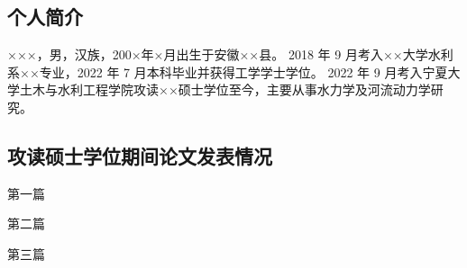 
\begin{resume}

\subsection*{个人简介}

×××，男，汉族，200×年×月出生于安徽××县。
2018 年 9 月考入××大学水利系××专业，2022 年 7 月本科毕业并获得工学学士学位。
2022 年 9 月考入宁夏大学土木与水利工程学院攻读××硕士学位至今，主要从事水力学及河流动力学研究。

\subsection*{攻读硕士学位期间论文发表情况}

\begin{achievements}
	\item 第一篇
	\item 第二篇
	\item 第三篇
\end{achievements}

\end{resume}
